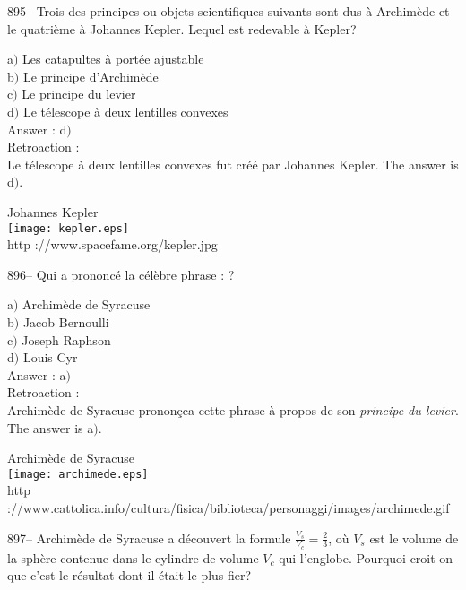 ﻿\documentclass[letterpaper, 12pt]{article}
\begin{document}
895-- Trois des principes ou objets scientifiques suivants sont dus
\`a Archim\`ede et le quatri\`eme \`a Johannes Kepler. Lequel est
redevable \`a Kepler?

a$)$ Les catapultes \`a port\'ee ajustable\\
b$)$ Le principe d'Archim\`ede \\
c$)$ Le principe du levier \\
d$)$ Le t\'elescope \`a deux lentilles convexes \\

Answer : d$)$\\

Retroaction : \\
Le t\'elescope \`a deux lentilles convexes fut cr\'e\'e par
Johannes Kepler. The answer is d$)$.\\

        \begin{center}
        Johannes Kepler\\
    \texttt{[image: kepler.eps]}\\
        {\footnotesize http ://www.spacefame.org/kepler.jpg}
    \end{center}

896-- Qui a prononc\'e la c\'el\`ebre phrase : \fg ?

a$)$ Archim\`ede de Syracuse\\
b$)$ Jacob Bernoulli \\
c$)$ Joseph Raphson \\
d$)$ Louis Cyr \\

Answer : a$)$\\

Retroaction : \\
Archim\`ede de Syracuse pronon\c cca cette phrase \`a propos de son {\sl
principe du levier}. The answer is a$)$.\\

        \begin{center}
        Archim\`ede de Syracuse\\
    \texttt{[image: archimede.eps]}\\
        {\footnotesize http
://www.cattolica.info/cultura/fisica/biblioteca/personaggi/images/archimede.gif}
    \end{center}

897-- Archim\`ede de Syracuse a d\'ecouvert la formule
$\frac{V_s}{V_c}=\frac23$, o\`u $V_s$ est le volume de la sph\`ere
contenue dans le cylindre de volume $V_c$ qui l'englobe. Pourquoi
croit-on que c'est le r\'esultat dont il \'etait le plus fier?
\end{document}
